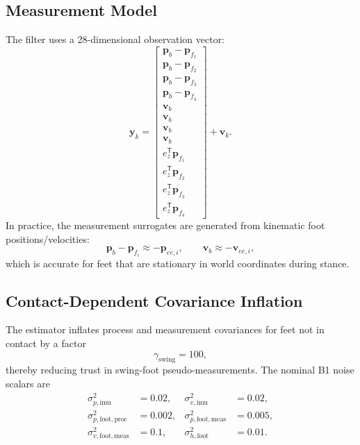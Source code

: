 \documentclass[11pt,a4paper]{article}
\newcommand{\vect}[1]{\bm{#1}}
\newcommand{\trans}{^{\mathsf T}}
\begin{document}
\subsection{Measurement Model}
The filter uses a 28-dimensional observation vector:
\begin{equation}
\vect{y}_k =
\begin{bmatrix}
\vect{p}_b - \vect{p}_{f_1} \\
\vect{p}_b - \vect{p}_{f_2} \\
\vect{p}_b - \vect{p}_{f_3} \\
\vect{p}_b - \vect{p}_{f_4} \\
\vect{v}_b \\
\vect{v}_b \\
\vect{v}_b \\
\vect{v}_b \\
e_z\trans \vect{p}_{f_1} \\
e_z\trans \vect{p}_{f_2} \\
e_z\trans \vect{p}_{f_3} \\
e_z\trans \vect{p}_{f_4}
\end{bmatrix}
+ \vect{v}_k.
\end{equation}
In practice, the measurement surrogates are generated from kinematic foot positions/velocities:
\begin{equation}
\vect{p}_b - \vect{p}_{f_i} \approx -\vect{p}_{ee,i},
\qquad
\vect{v}_b \approx -\vect{v}_{ee,i},
\end{equation}
which is accurate for feet that are stationary in world coordinates during stance.

\subsection{Contact-Dependent Covariance Inflation}
The estimator inflates process and measurement covariances for feet not in contact by a factor
\begin{equation}
\gamma_{\mathrm{swing}} = 100,
\end{equation}
thereby reducing trust in swing-foot pseudo-measurements. The nominal B1 noise scalars are
\begin{align}
\sigma^2_{p,\mathrm{imu}} &= 0.02, &
\sigma^2_{v,\mathrm{imu}} &= 0.02, \\
\sigma^2_{p,\mathrm{foot,proc}} &= 0.002, &
\sigma^2_{p,\mathrm{foot,meas}} &= 0.005, \\
\sigma^2_{v,\mathrm{foot,meas}} &= 0.1, &
\sigma^2_{h,\mathrm{foot}} &= 0.01.
\end{align}
\end{document}
